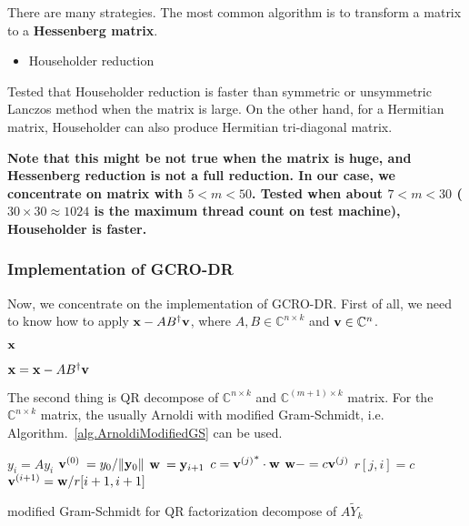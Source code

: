 There are many strategies. The most common algorithm is to transform a matrix to a \textbf{Hessenberg matrix}.

\begin{itemize}
  \item {}Householder reduction
\end{itemize}

Tested that Householder reduction is faster than symmetric or unsymmetric Lanczos method when the matrix is large. On the other hand, for a Hermitian matrix, Householder can also produce Hermitian tri-diagonal matrix.

\textbf{Note that this might be not true when the matrix is huge, and Hessenberg reduction is not a full reduction. In our case, we concentrate on matrix with $5<m<50$. Tested when about $7<m<30$ ($30 \times 30 \approx 1024$ is the maximum thread count on test machine), Householder is faster.}



\subsubsection{\label{sec:implementationgcrodr}Implementation of GCRO-DR}

Now, we concentrate on the implementation of GCRO-DR. First of all, we need to know how to apply ${\bf x}-AB^{\dagger}{\bf v}$, where $A,B\in \mathbb{C}^{n\times k}$ and ${\bf v}\in \mathbb{C}^n$.
\begin{algorithm}[H]
\begin{algorithmic}
\EndFor

\Return $\bf x$
\end{algorithmic}
\caption{${\bf x}={\bf x}-AB^{\dagger}{\bf v}$}
\end{algorithm}

The second thing is QR decompose of $\mathbb{C}^{n\times k}$ and $\mathbb{C}^{(m+1)\times k}$ matrix. For the $\mathbb{C}^{n\times k}$ matrix, the usually Arnoldi with modified Gram-Schmidt, i.e. Algorithm.~\ref{alg.ArnoldiModifiedGS} can be used.
\begin{algorithm}[H]
\begin{algorithmic}
    \State $y_i=Ay_i$
\EndFor
\State ${\bf v}^{(0)}\:=y_0/\|{\bf y}_0\|$
    \State ${\bf w}\:={\bf y}_{i+1}$
        \State $c={{\bf v}^{(j)}}^*\cdot {\bf w}$
        \State ${\bf w}-=c{\bf v}^{(j)}$
        \State $r[j,i]=c$
    \EndFor
    \State ${\bf v}^{(i+1)}={\bf w}/r[i+1,i+1]$
\EndFor

\end{algorithmic}
\caption{modified Gram-Schmidt for QR factorization decompose of $A\tilde{Y}_k$}
\end{algorithm}

